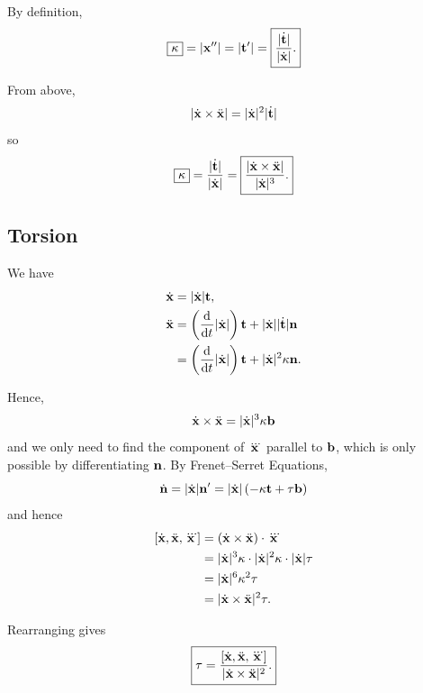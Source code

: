 \documentclass{article}
\theoremstyle{definition}
\theoremstyle{remark}
\DeclarePairedDelimiter{\abs}{\lvert}{\rvert}
\newcommand{\cross}{\times}
\begin{document}
By definition,
\[
    \boxed{\kappa} = \abs{\vb{x}''} = \abs{\vb{t}'} = \boxed{\frac{\abs{\dot{\vb{t}}}}{\abs{\dot{\vb{x}}}}.}
\]

From above,
\[
    \abs{\dot{\vb{x}} \cross \ddot{\vb{x}}} = \abs{\dot{\vb{x}}}^2 \abs{\dot{\vb{t}}}
\]
so
\[
    \boxed{\kappa} = \frac{\abs{\dot{\vb{t}}}}{\abs{\dot{\vb{x}}}} = \boxed{\frac{\abs{\dot{\vb{x}} \cross \ddot{\vb{x}}}}{\abs{\dot{\vb{x}}}^3}.}
\]

\subsection*{Torsion}

We have
\begin{align*}
    \dot{\vb{x}} &= \abs{\dot{\vb{x}}} \vb{t}, \\
    \ddot{\vb{x}} &= \pqty{\dv{t} \abs{\dot{\vb{x}}}} \vb{t} + \abs{\dot{\vb{x}}} \abs{\dot{\vb{t}}} \vb{n} \\
    &= \pqty{\dv{t} \abs{\dot{\vb{x}}}} \vb{t} + \abs{\dot{\vb{x}}}^2 \kappa \vb{n}.
\end{align*}

Hence,
\[
    \dot{\vb{x}} \cross \ddot{\vb{x}} = \abs{\dot{\vb{x}}}^3 \kappa \vb{b}
\]
and we only need to find the component of \(\dddot{\vb{x}}\) parallel to \(\vb{b}\), which is only possible by differentiating \(\vb{n}\). By Frenet--Serret Equations,
\[
    \dot{\vb{n}} = \abs{\dot{\vb{x}}} \vb{n}' = \abs{\dot{\vb{x}}} \pqty{- \kappa \vb{t} + \tau \vb{b}}
\]
and hence
\begin{align*}
    \bqty{\dot{\vb{x}}, \ddot{\vb{x}}, \dddot{\vb{x}}} &= \pqty{\dot{\vb{x}} \cross \ddot{\vb{x}}} \cdot \dddot{\vb{x}} \\
    &= \abs{\dot{\vb{x}}}^3 \kappa \cdot \abs{\dot{\vb{x}}}^2 \kappa \cdot \abs{\dot{\vb{x}}} \tau \\
    &= \abs{\dot{\vb{x}}}^6 \kappa^2 \tau \\
    &= \abs{\dot{\vb{x}} \cross \ddot{\vb{x}}}^2 \tau.
\end{align*}

Rearranging gives
\[
    \boxed{\tau = \frac{\bqty{\dot{\vb{x}}, \ddot{\vb{x}}, \dddot{\vb{x}}}}{\abs{\dot{\vb{x}} \cross \ddot{\vb{x}}}^2}.}
\]
\end{document}
